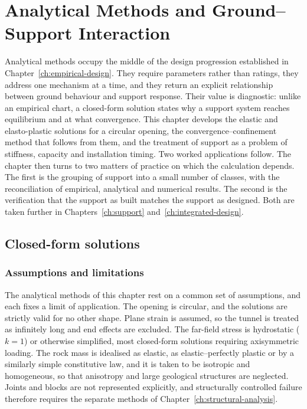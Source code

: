 \chapter{Analytical Methods and Ground--Support Interaction}
\label{ch:ccm}

Analytical methods occupy the middle of the design progression established in
Chapter~\ref{ch:empirical-design}. They require parameters rather than
ratings, they address one mechanism at a time, and they return an explicit
relationship between ground behaviour and support response. Their value is
diagnostic: unlike an empirical chart, a closed-form solution states why a
support system reaches equilibrium and at what convergence. This chapter
develops the elastic and elasto-plastic solutions for a circular opening, the
convergence--confinement method that follows from them, and the treatment of
support as a problem of stiffness, capacity and installation timing. Two
worked applications follow. The chapter then turns to two matters of practice
on which the calculation depends. The first is the grouping of support into a
small number of classes, with the reconciliation of empirical, analytical and
numerical results. The second is the verification that the support as built
matches the support as designed. Both are taken further in
Chapters~\ref{ch:support} and~\ref{ch:integrated-design}.

\section{Closed-form solutions}
\label{sec:closed-form-solutions}

\subsection{Assumptions and limitations}
\label{sec:analytical-assumptions}

The analytical methods of this chapter rest on a common set of assumptions,
and each fixes a limit of application. The opening is circular, and the
solutions are strictly valid for no other shape. Plane strain is assumed, so
the tunnel is treated as infinitely long and end effects are excluded. The
far-field stress is hydrostatic ($k=1$) or otherwise simplified, most
closed-form solutions requiring axisymmetric loading. The rock mass is
idealised as elastic, as elastic--perfectly plastic or by a similarly simple
constitutive law, and it is taken to be isotropic and homogeneous, so that
anisotropy and large geological structures are neglected. Joints and blocks
are not represented explicitly, and structurally controlled failure therefore
requires the separate methods of Chapter~\ref{ch:structural-analysis}.

